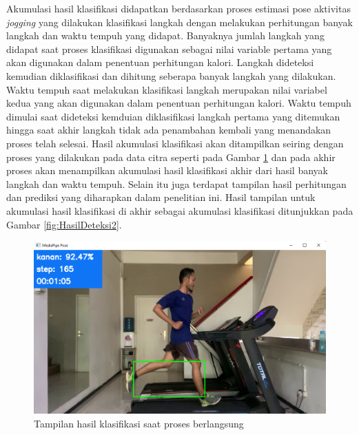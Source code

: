 Akumulasi hasil klasifikasi didapatkan berdasarkan proses estimasi pose aktivitas \emph{jogging} yang dilakukan klasifikasi langkah dengan melakukan perhitungan banyak langkah dan waktu tempuh yang didapat. Banyaknya jumlah langkah yang didapat saat proses klasifikasi digunakan sebagai nilai variable pertama yang akan digunakan dalam penentuan perhitungan kalori. Langkah dideteksi kemudian diklasifikasi dan dihitung seberapa banyak langkah yang dilakukan. Waktu tempuh saat melakukan klasifikasi langkah merupakan nilai variabel kedua yang akan digunakan dalam penentuan perhitungan kalori. Waktu tempuh dimulai saat dideteksi kemduian diklasifikasi langkah pertama yang ditemukan hingga saat akhir langkah tidak ada penambahan kembali yang menandakan proses telah selesai. Hasil akumulasi klasifikasi akan ditampilkan seiring dengan proses yang dilakukan pada data citra seperti pada Gambar \ref{fig:HasilDeteksi} dan pada akhir proses akan menampilkan akumulasi hasil klasifikasi akhir dari hasil banyak langkah dan waktu tempuh. Selain itu juga terdapat tampilan hasil perhitungan dan prediksi yang diharapkan dalam penelitian ini. Hasil tampilan untuk akumulasi hasil klasifikasi di akhir sebagai akumulasi klasifikasi ditunjukkan pada Gambar \ref{fig:HasilDeteksi2}.

\begin{figure}[H]
  \centering
  \includegraphics[scale=0.48]{gambar/hasil deteksi.png}
  \caption{Tampilan hasil klasifikasi saat proses berlangsung}
  \label{fig:HasilDeteksi}
\end{figure}


